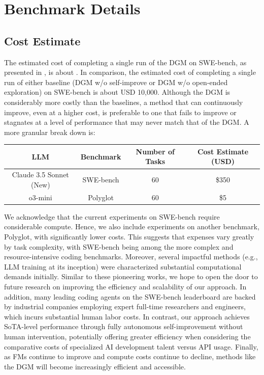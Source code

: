 \section{Benchmark Details}

\subsection{Cost Estimate}
\label{app:cost-estimate}

The estimated cost of completing a single run of the DGM on SWE-bench, as presented in , is about \DgmSweBenchCostEstimate{}. In comparison, the estimated cost of completing a single run of either baseline (DGM w/o self-improve or DGM w/o open-ended exploration) on SWE-bench is about USD 10,000. Although the DGM is considerably more costly than the baselines, a method that can continuously improve, even at a higher cost, is preferable to one that fails to improve or stagnates at a level of performance that may never match that of the DGM. A more granular break down is:

\begin{table}[H]
\centering
\begin{tabular}{@{}cccc@{}}
\toprule
\textbf{LLM} & \textbf{Benchmark} & \textbf{Number of Tasks} & \textbf{Cost Estimate (USD)} \\ \midrule
Claude 3.5 Sonnet (New) & SWE-bench & 60 & \$350 \\
o3-mini & Polyglot & 60 & \$5 \\ \bottomrule
\end{tabular}
\end{table}

We acknowledge that the current experiments on SWE-bench require considerable compute. Hence, we also include experiments on another benchmark, Polyglot, with significantly lower costs. This suggests that expenses vary greatly by task complexity, with SWE-bench being among the more complex and resource-intensive coding benchmarks. Moreover, several impactful methods (e.g., LLM training at its inception) were characterized substantial computational demands initially. Similar to these pioneering works, we hope to open the door to future research on improving the efficiency and scalability of our approach. In addition, many leading coding agents on the SWE-bench leaderboard are backed by industrial companies employing expert full-time researchers and engineers, which incurs substantial human labor costs. In contrast, our approach achieves SoTA-level performance through fully autonomous self-improvement without human intervention, potentially offering greater efficiency when considering the comparative costs of specialized AI development talent versus API usage. Finally, as FMs continue to improve and compute costs continue to decline, methods like the DGM will become increasingly efficient and accessible.

